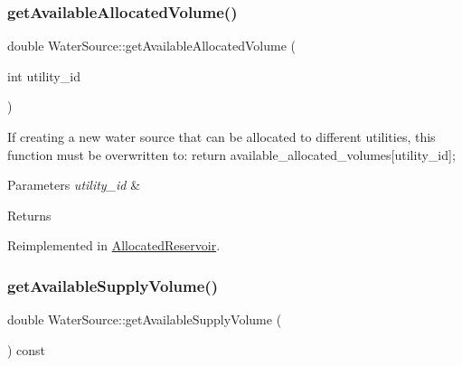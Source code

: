 \mbox{\label{classWaterSource_a42c687a3be3d88ba38dbea668c8d35cf}} 
\subsubsection{\texorpdfstring{get\+Available\+Allocated\+Volume()}{getAvailableAllocatedVolume()}}
{\footnotesize\ttfamily double Water\+Source\+::get\+Available\+Allocated\+Volume (\begin{DoxyParamCaption}\item[{int}]{utility\+\_\+id }\end{DoxyParamCaption})\hspace{0.3cm}{\ttfamily [virtual]}}

If creating a new water source that can be allocated to different utilities, this function must be overwritten to\+: return available\+\_\+allocated\+\_\+volumes\mbox{[}utility\+\_\+id\mbox{]}; 
\begin{DoxyParams}{Parameters}
{\em utility\+\_\+id} & \\
\hline
\end{DoxyParams}
\begin{DoxyReturn}{Returns}

\end{DoxyReturn}


Reimplemented in \mbox{\hyperlink{classAllocatedReservoir_ae161ebfc285aa69cb8b7f4fe20ee7a2e}{Allocated\+Reservoir}}.

\mbox{\label{classWaterSource_af6445a2dd3764907bcb9a37d4647f910}} 
\subsubsection{\texorpdfstring{get\+Available\+Supply\+Volume()}{getAvailableSupplyVolume()}}
{\footnotesize\ttfamily double Water\+Source\+::get\+Available\+Supply\+Volume (\begin{DoxyParamCaption}{ }\end{DoxyParamCaption}) const}


